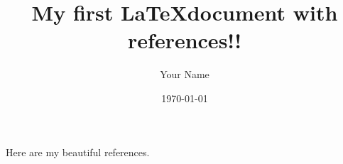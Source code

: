 \documentclass[]{article}
\begin{document}
\title{My first \LaTeX document with references!!}
\author{Your Name}
\date{\today}

\maketitle

Here are my beautiful references.
\end{document}
